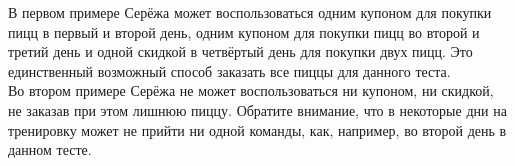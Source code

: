 \begin{problem}
\Examples

\begin{example}
%
%
\end{example}

\Explanation

В первом примере Серёжа может воспользоваться одним купоном для покупки пицц в первый и второй день, одним купоном для покупки пицц во второй и третий день и одной скидкой в четвёртый день для покупки двух пицц. Это единственный возможный способ заказать все пиццы для данного теста.\\

Во втором примере Серёжа не может воспользоваться ни купоном, ни скидкой, не заказав при этом лишнюю пиццу. Обратите внимание, что в некоторые дни на тренировку может не прийти ни одной команды, как, например, во второй день в данном тесте.

\end{problem}

